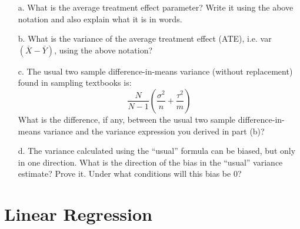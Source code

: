 \documentclass{article}
\begin{document}
\begin{itemize}
\item[a.] What is the average treatment effect parameter? Write it
  using the above notation and also explain what it is in words. 
\item[b.] What is the variance of the average treatment effect (ATE), i.e. var$(\bar X - \bar Y)$, using the above notation? 
\item[c.] The usual two sample difference-in-means variance (without
  replacement)  found in sampling textbooks is:  
$$ \frac{N}{N-1} \left( \frac{\sigma^2}{n} + \frac{\tau^2}{m} \right)$$
What is the difference, if any, between the usual two sample
difference-in-means variance and the variance expression you derived
in part (b)?
\item[d.] The variance calculated using the ``usual'' formula can be biased, but only in one direction. What is the direction of the bias in the ``usual'' variance estimate? Prove it. Under what conditions will this bias be 0?
\end{itemize}




\section*{Linear Regression}
\end{document}
